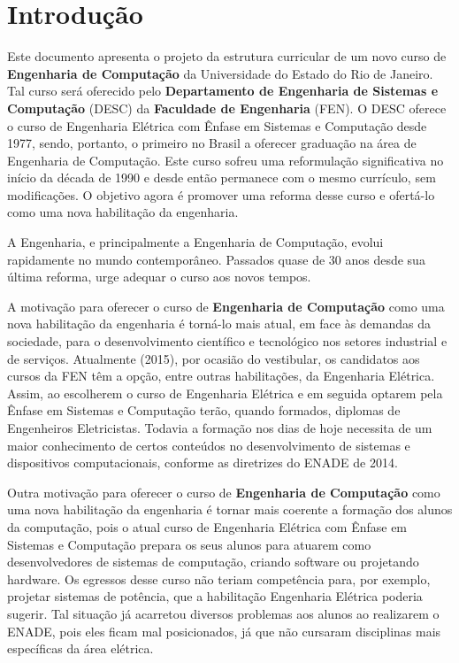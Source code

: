 \chapter{Introdução}
\label{intro} %

Este documento apresenta o projeto da estrutura curricular de um novo curso de \textbf{Engenharia de Computação} da Universidade do Estado do Rio de Janeiro. Tal curso será oferecido pelo \textbf{Departamento de Engenharia de Sistemas e Computação} (DESC) da \textbf{Faculdade de Engenharia} (FEN). O DESC oferece o curso de Engenharia Elétrica com Ênfase em Sistemas e Computação desde 1977, sendo, portanto, o primeiro no Brasil a oferecer graduação na área de Engenharia de Computação. Este curso sofreu uma reformulação significativa no início da década de 1990 e desde então permanece com o mesmo currículo, sem modificações. O objetivo agora é promover uma reforma desse curso e ofertá-lo como uma nova habilitação da engenharia.

A Engenharia, e principalmente a Engenharia de Computação, evolui rapidamente no mundo contemporâneo. Passados quase de 30 anos desde sua última reforma, urge adequar o curso aos novos tempos.

A motivação para oferecer o curso de \textbf{Engenharia de Computação} como uma nova habilitação da engenharia é torná-lo mais atual, em face às demandas da sociedade, para o desenvolvimento científico e tecnológico nos setores industrial e de serviços. Atualmente (2015), por ocasião do vestibular, os candidatos aos cursos da FEN têm a opção, entre outras habilitações, da Engenharia Elétrica. Assim, ao escolherem o curso de Engenharia Elétrica e em seguida optarem pela Ênfase em Sistemas e Computação terão, quando formados, diplomas de Engenheiros Eletricistas. Todavia a formação nos dias de hoje necessita de um maior conhecimento de certos conteúdos no desenvolvimento de sistemas e dispositivos computacionais, conforme as diretrizes do ENADE de 2014.

Outra motivação para oferecer o curso de \textbf{Engenharia de Computação} como uma nova habilitação da engenharia é tornar mais coerente a formação dos alunos da computação, pois o atual curso de Engenharia Elétrica com Ênfase em Sistemas e Computação prepara os seus alunos para atuarem como desenvolvedores  de sistemas de computação, criando software ou projetando hardware. Os egressos desse curso não teriam competência para, por exemplo, projetar sistemas de potência, que a habilitação Engenharia Elétrica poderia sugerir. Tal situação já acarretou diversos problemas aos alunos ao realizarem o ENADE, pois eles ficam mal posicionados, já que não cursaram disciplinas mais específicas da área elétrica.

